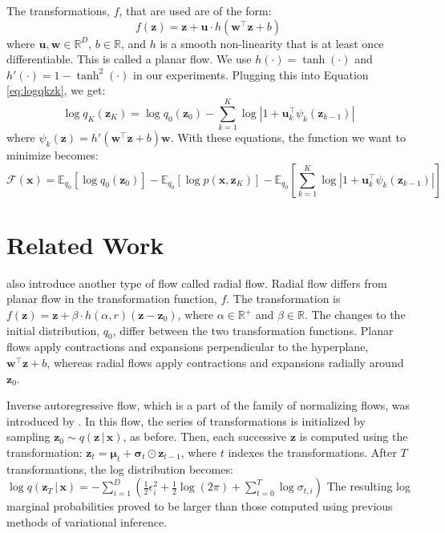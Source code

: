 \documentclass{article}
\newcommand{\R}{\mathbb{R}}
\newcommand{\E}{\mathbb{E}}
\newcommand{\bz}{\mathbf{z}}
\newcommand{\bx}{\mathbf{x}}
\newcommand{\bu}{\mathbf{u}}
\newcommand{\bw}{\mathbf{w}}
\newcommand{\given}{\,|\,}
\newcommand{\bsig}{\boldsymbol{\sigma}}
\newcommand{\bmu}{\boldsymbol{\mu}}
\begin{document}
The transformations, $f$, that are used are of the form:
\begin{equation}
	f(\bz) = \bz + \bu \cdot h(\bw^\top\bz + b)
\end{equation}
where $\bu, \bw \in \R^D$, $b \in \R$, and $h$ is a smooth non-linearity that is at least once differentiable.
This is called a planar flow.  We use $h(\cdot) = \tanh(\cdot)$ and $h'(\cdot) = 1 - \tanh^2(\cdot)$ in our 
experiments.  Plugging this into Equation \ref{eq:logqkzk}, we get:
\begin{equation}
	\log q_K(\bz_K) = \log q_0(\bz_0) - \sum_{k=1}^K \log \left|1 + \bu_k^\top\psi_k(\bz_{k-1})\right|
\end{equation}
where $\psi_k(\bz) = h'(\bw^\top\bz + b)\bw$. With these equations, the function we want to minimize becomes:
\begin{equation} \label{eq:ELBO_NormFlow}
	\mathcal{F}(\bx) = \E_{q_0}\left[\log q_0(\bz_0)\right] - \E_{q_0}\left[\log p(\bx, \bz_K)\right] 
					- \E_{q_0}\left[\sum_{k=1}^K\log \left|1 + \bu_k^\top\psi_k(\bz_{k-1})\right|\right]
\end{equation}

\section{Related Work}
\label{sec:RelatedWork}
\citet{RM15} also introduce another type of flow called radial flow.  Radial flow differs from planar flow in the
transformation function, $f$.  The transformation is $f(\bz) = \bz + \beta\cdot h(\alpha, r)(\bz - \bz_0)$, where
$\alpha \in \R^+$ and $\beta \in \R$.  The changes to the initial distribution, $q_0$, differ between the two
transformation functions.  Planar flows apply contractions and expansions perpendicular to the hyperplane,
$\bw^\top\bz + b$, whereas radial flows apply contractions and expansions radially around $\bz_0$.

Inverse autoregressive flow, which is a part of the family of normalizing flows, was introduced by \citet{KS16}.
In this flow, the series of transformations is initialized by sampling $\bz_0 \sim q(\bz \given \bx)$, as before. 
Then, each successive $\bz$ is computed using the transformation: $\bz_t = \bmu_t + \bsig_t \odot \bz_{t-1}$,
where $t$ indexes the transformations.  After $T$ transformations, the log distribution becomes: 
$\log q(\bz_T \given \bx) = -\sum_{i=1}^D\left(\frac{1}{2}\epsilon_i^2 + \frac{1}{2}\log(2\pi) + \sum_{t=0}^T\log\sigma_{t,i}\right)$
The resulting log marginal probabilities proved to be larger than those computed using previous methods of
variational inference.
\end{document}
